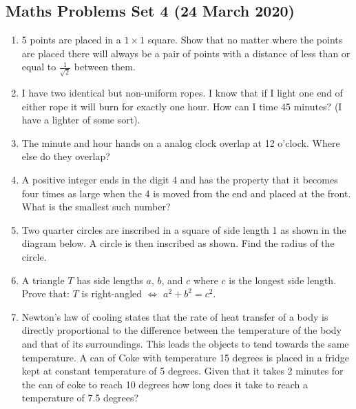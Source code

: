 \documentclass{article}
\begin{document}
\begin{center}
        \section*{Maths Problems Set 4 (24 March 2020)}
\end{center}

\begin{enumerate}
    \item
    5 points are placed in a $1\times1$ square. Show that no matter where the points are placed there will always be a pair of points with a distance of less than or equal to $\frac{1}{\sqrt{2}}$ between them.
    
    \item
    I have two identical but non-uniform ropes. I know that if I light one end of either rope it will burn for exactly one hour. How can I time 45 minutes? (I have a lighter of some sort).
    
    \item
    The minute and hour hands on a analog clock overlap at 12 o’clock. Where else do they overlap?
    
    \item
    A positive integer ends in the digit 4 and has the property that it becomes four times as large when the 4 is moved from the end and placed at the front. What is the smallest such number?
    
    \item
    Two quarter circles are inscribed in a square of side length 1 as shown in the diagram below. A circle is then inscribed as shown. Find the radius of the circle.
    
    
    \item
    A triangle $T$ has side lengths $a$, $b$, and $c$ where $c$ is the longest side length. Prove that: $T$ is right-angled $\iff$ $a^2 + b^2 = c^2$.
    
    \item
    Newton's law of cooling states that the rate of heat transfer of a body is directly proportional to the difference between the temperature of the body and that of its surroundings. This leads the objects to tend towards the same temperature. A can of Coke with temperature 15 degrees is placed in a fridge kept at constant temperature of 5 degrees. Given that it takes 2 minutes for the can of coke to reach 10 degrees how long does it take to reach a temperature of 7.5 degrees?
    

\end{enumerate}
\end{document}
